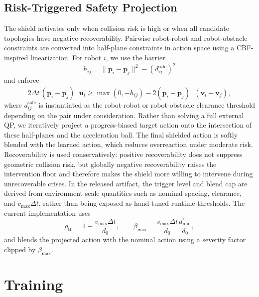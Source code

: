 \documentclass[journal]{IEEEtran}
\newcommand{\bfu}{\mathbf{u}}
\newcommand{\bfp}{\mathbf{p}}
\newcommand{\bfv}{\mathbf{v}}
\begin{document}
\subsection{Risk-Triggered Safety Projection}
\label{sec:shield}

The shield activates only when collision risk is high or when all
candidate topologies have negative recoverability. Pairwise robot-robot
and robot-obstacle constraints are converted into half-plane
constraints in action space using a CBF-inspired linearization. For
robot $i$, we use the barrier
\begin{equation}
h_{ij} = \|\bfp_i - \bfp_j\|^2 - (d_{ij}^{\mathrm{safe}})^2
\label{eq:barrier}
\end{equation}
and enforce
\begin{equation}
2\Delta t\,(\bfp_i-\bfp_j)^\top \bfu_i \ge
\max(0,-h_{ij}) - 2(\bfp_i-\bfp_j)^\top(\bfv_i-\bfv_j),
\label{eq:cbf_constraint}
\end{equation}
where $d_{ij}^{\mathrm{safe}}$ is instantiated as the robot-robot or
robot-obstacle clearance threshold depending on the pair under
consideration.
Rather than solving a full external QP, we iteratively project a
progress-biased target action onto the intersection of these half-planes
and the acceleration ball. The final shielded action is softly blended
with the learned action, which reduces overreaction under moderate risk.
Recoverability is used conservatively: positive
recoverability does not suppress geometric collision risk, but globally
negative recoverability raises the intervention floor and therefore makes
the shield more willing to intervene during unrecoverable crises. In the
released artifact, the trigger level and blend cap are derived from
environment scale quantities such as nominal spacing, clearance, and
$v_{\max}\Delta t$, rather than being exposed as hand-tuned runtime
thresholds. The current implementation uses
\begin{equation}
\rho_{\mathrm{th}} =
1 - \frac{v_{\max}\Delta t}{d_0},
\qquad
\beta_{\max} =
\frac{v_{\max}\Delta t}{d_0}
\frac{d_{\min}^{\mathrm{rr}}}{d_0},
\label{eq:shield_scales}
\end{equation}
and blends the projected action with the nominal action using a severity
factor clipped by $\beta_{\max}$.

\section{Training}
\label{sec:training}
\end{document}
